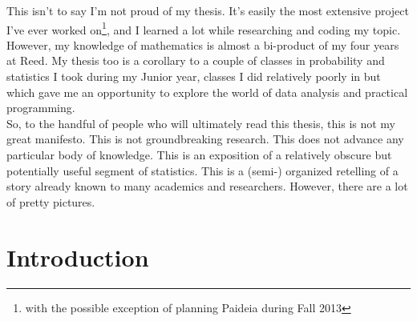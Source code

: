 \documentclass[12pt,twoside]{reedthesis}
\begin{document}
	This isn't to say I'm not proud of my thesis. It's easily the most extensive project I've ever worked on\footnote{with the possible exception of planning Paideia during Fall 2013}, and I learned a lot while researching and coding my topic. However, my knowledge of mathematics is almost a bi-product of my four years at Reed. My thesis too is a corollary to a couple of classes in probability and statistics I took during my Junior year, classes I did relatively poorly in but which gave me an opportunity to explore the world of data analysis and practical programming. \\
	
	So, to the handful of people who will ultimately read this thesis, this is not my great manifesto. This is not groundbreaking research. This does not advance any particular body of knowledge. This is an exposition of a relatively obscure but potentially useful segment of statistics. This is a (semi-) organized retelling of a story already known to many academics and researchers. However, there are a lot of pretty pictures. \\
	
	
	
	
	
    \tableofcontents
    \listoftables
    \listoffigures

	

  \mainmatter %
  \pagestyle{fancyplain} %


    \chapter*{Introduction}
	
\end{document}
